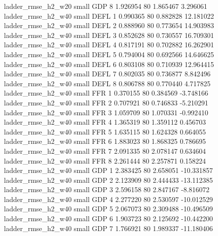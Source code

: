       ladder_rmse_h2_w20      small      GDP                 8 1.926954 80       1.865467           3.296061
      ladder_rmse_h2_w40      small     DEFL                 1 0.990365 80       0.882828          12.181022
      ladder_rmse_h2_w40      small     DEFL                 2 0.888960 80       0.773654          14.903983
      ladder_rmse_h2_w40      small     DEFL                 3 0.852628 80       0.730557          16.709301
      ladder_rmse_h2_w40      small     DEFL                 4 0.817191 80       0.702882          16.262901
      ladder_rmse_h2_w40      small     DEFL                 5 0.794004 80       0.692566          14.646625
      ladder_rmse_h2_w40      small     DEFL                 6 0.803108 80       0.710939          12.964415
      ladder_rmse_h2_w40      small     DEFL                 7 0.802035 80       0.736877           8.842496
      ladder_rmse_h2_w40      small     DEFL                 8 0.806788 80       0.770440           4.717825
      ladder_rmse_h2_w40      small      FFR                 1 0.370155 80       0.384569          -3.748166
      ladder_rmse_h2_w40      small      FFR                 2 0.707921 80       0.746833          -5.210291
      ladder_rmse_h2_w40      small      FFR                 3 1.059709 80       1.070331          -0.992410
      ladder_rmse_h2_w40      small      FFR                 4 1.365319 80       1.359112           0.456703
      ladder_rmse_h2_w40      small      FFR                 5 1.635115 80       1.624328           0.664055
      ladder_rmse_h2_w40      small      FFR                 6 1.883023 80       1.868325           0.786695
      ladder_rmse_h2_w40      small      FFR                 7 2.091335 80       2.078147           0.634604
      ladder_rmse_h2_w40      small      FFR                 8 2.261444 80       2.257871           0.158224
      ladder_rmse_h2_w40      small      GDP                 1 2.383425 80       2.658051         -10.331857
      ladder_rmse_h2_w40      small      GDP                 2 2.123909 80       2.444433         -13.112385
      ladder_rmse_h2_w40      small      GDP                 3 2.596158 80       2.847167          -8.816072
      ladder_rmse_h2_w40      small      GDP                 4 2.277220 80       2.530597         -10.012529
      ladder_rmse_h2_w40      small      GDP                 5 2.067073 80       2.309488         -10.496509
      ladder_rmse_h2_w40      small      GDP                 6 1.903723 80       2.125692         -10.442200
      ladder_rmse_h2_w40      small      GDP                 7 1.766921 80       1.989337         -11.180406
